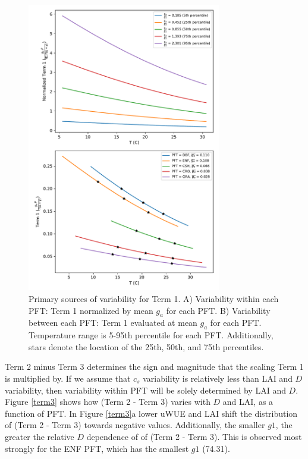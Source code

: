 \documentclass[draft,linenumbers]{agujournal}
\begin{document}
\begin{figure}[h]
\centering
\includegraphics[width=20pc]{./fig04.pdf}
\caption{Primary sources of variability for Term 1. A) Variability within each PFT: Term 1 normalized by mean $g_a$ for each PFT. B) Variability between each PFT: Term 1 evaluated at mean $g_a$ for each PFT. Temperature range is 5-95th percentile for each PFT. Additionally, stars denote the location of the 25th, 50th, and 75th percentiles.}
\label{scale_vary}
\end{figure}


Term 2 minus Term 3 determines the sign and magnitude that the scaling Term 1 is multiplied by. If we assume that $c_s$ variability is relatively less than LAI and $D$ variability, then variability within PFT will be solely determined by LAI and $D$. Figure \ref{term3} shows how (Term 2 - Term 3) varies with $D$ and LAI, as a function of PFT. In Figure \ref{term3}a lower uWUE and LAI shift the distribution of (Term 2 - Term 3) towards negative values. Additionally, the smaller $g1$, the greater the relative $D$ dependence of of (Term 2 - Term 3). This is observed most strongly for the ENF PFT, which has the smallest $g1$ (74.31). 
\end{document}
